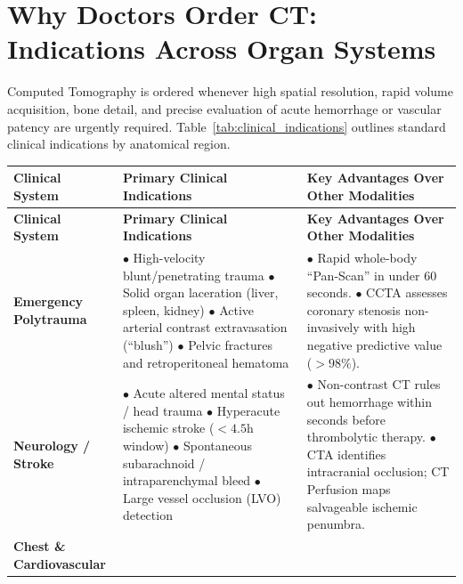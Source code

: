 \documentclass[11pt,a4paper]{article}
\begin{document}
\section{Why Doctors Order CT: Indications Across Organ Systems}

Computed Tomography is ordered whenever high spatial resolution, rapid volume acquisition, bone detail, and precise evaluation of acute hemorrhage or vascular patency are urgently required. Table~\ref{tab:clinical_indications} outlines standard clinical indications by anatomical region.

\begin{longtable}{p{3.2cm}p{6cm}p{6cm}}
\toprule
\textbf{Clinical System} & \textbf{Primary Clinical Indications} & \textbf{Key Advantages Over Other Modalities} \\
\midrule
\endfirsthead
\toprule
\textbf{Clinical System} & \textbf{Primary Clinical Indications} & \textbf{Key Advantages Over Other Modalities} \\
\midrule
\endhead
\bottomrule
\endfoot
\textbf{Emergency Polytrauma} & 
$\bullet$ High-velocity blunt/penetrating trauma\newline
$\bullet$ Solid organ laceration (liver, spleen, kidney)\newline
$\bullet$ Active arterial contrast extravasation (``blush'')\newline
$\bullet$ Pelvic fractures and retroperitoneal hematoma & 
$\bullet$ Rapid whole-body ``Pan-Scan'' in under 60 seconds.\newline
$\bullet$ CCTA assesses coronary stenosis non-invasively with high negative predictive value ($>98\%$). \\
\midrule
\textbf{Neurology / Stroke} & 
$\bullet$ Acute altered mental status / head trauma\newline
$\bullet$ Hyperacute ischemic stroke ($<4.5$h window)\newline
$\bullet$ Spontaneous subarachnoid / intraparenchymal bleed\newline
$\bullet$ Large vessel occlusion (LVO) detection & 
$\bullet$ Non-contrast CT rules out hemorrhage within seconds before thrombolytic therapy.\newline
$\bullet$ CTA identifies intracranial occlusion; CT Perfusion maps salvageable ischemic penumbra. \\
\midrule
\textbf{Chest \& Cardiovascular} & 

\end{longtable}
\end{document}
